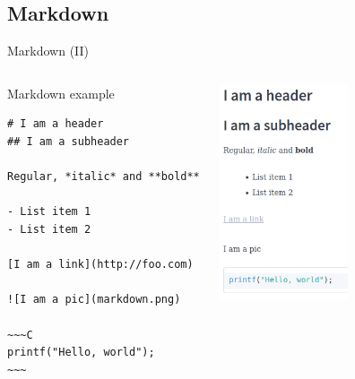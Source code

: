 \documentclass[10pt,compress]{beamer} %
\begin{document}
\subsection{Markdown}
\begin{frame}[fragile]{Markdown (II)}
	\vspace{-0.3cm}
	\begin{columns}
		\begin{exampleblock}{Markdown example}
			\vspace{-0.3cm}
			\begin{lstlisting}[mathescape]
# I am a header
## I am a subheader

Regular, *italic* and **bold**

- List item 1
- List item 2

[I am a link](http://foo.com)

![I am a pic](markdown.png)

~~~C
printf("Hello, world");
~~~
\end{lstlisting}
			\vspace{-0.2cm}
		\end{exampleblock}
 		\includegraphics[width=0.6\textwidth]{figs/md.png}
	\end{columns}
\end{frame}
\end{document}
